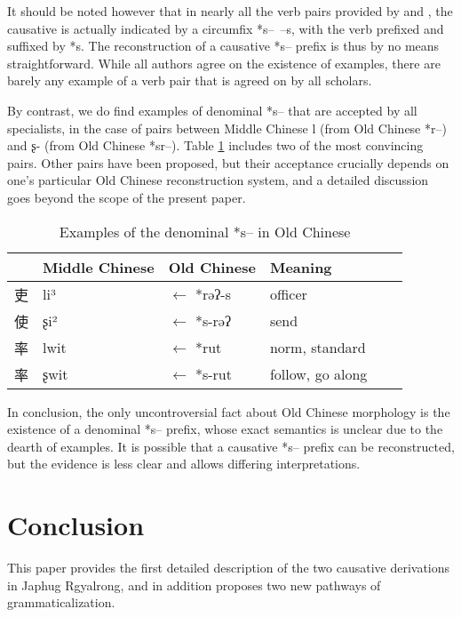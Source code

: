 \documentclass[oldfontcommands,oneside,a4paper,11pt]{article}
\newcommand{\ipa}[1]{{\phon \mbox{#1}}} %
\newcommand{\zh}[1]{{\cn #1}}
\begin{document}
It should be noted however that in nearly all the verb pairs provided by \citealt{sagart99roc} and \citet{sagart12sprefix}, the causative is actually indicated by a circumfix *\ipa{s-- --s}, with the verb prefixed and suffixed by *\ipa{s}. The reconstruction of a causative *\ipa{s--} prefix is thus by no means straightforward. While all authors agree on the existence of examples, there are barely any example of a verb pair that is agreed on by all scholars.

 By contrast, we do find examples of denominal *\ipa{s--} that are accepted by all specialists, in the case of pairs between Middle Chinese \ipa{l} (from Old Chinese *\ipa{r--}) and \ipa{ʂ-} (from Old Chinese *\ipa{sr--}). Table \ref{tab:denom.oc} includes two of the most convincing pairs. Other pairs have been proposed, but their acceptance crucially depends on one's particular Old Chinese reconstruction system, and a detailed discussion goes beyond the scope of the present paper.  
  
  \begin{table}[h]
\caption{Examples of the denominal *\ipa{s--} in Old Chinese}\label{tab:denom.oc} \centering
\begin{tabular}{llllll}
\toprule 
  &Middle Chinese  &Old Chinese &Meaning \\
  \midrule
\zh{吏}& \ipa{li³} &$\leftarrow$ *\ipa{rəʔ-s}  & officer \\
\zh{使}& \ipa{ʂi²} &$\leftarrow$ *\ipa{s-rəʔ} &send  \\
\zh{率}& \ipa{lwit} &$\leftarrow$ *\ipa{rut} & norm, standard \\
\zh{率} &\ipa{ʂwit} &$\leftarrow$ *\ipa{s-rut} & follow, go along  \\
\bottomrule
\end{tabular}
\end{table}
 

 In conclusion, the only uncontroversial fact about Old Chinese morphology is the existence of a denominal *\ipa{s--} prefix, whose exact semantics is unclear due to the dearth of examples. It is possible that a causative *\ipa{s--} prefix can be reconstructed, but the evidence is less clear and allows differing interpretations.
  
\section{Conclusion}

This paper   provides the first detailed description of the two causative derivations in Japhug Rgyalrong, and in addition  proposes two new pathways of grammaticalization.
\end{document}
